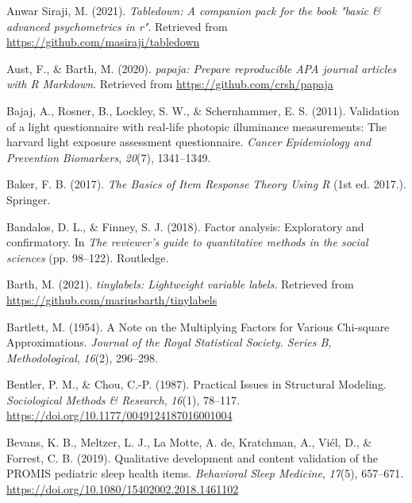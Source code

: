 \documentclass[
  english,
  man]{apa6}
\newlength{\cslhangindent}
\newlength{\cslentryspacingunit} %
\newenvironment{CSLReferences}[2] %
 {%
  \setlength{\parindent}{0pt}
  \ifodd #1
  \let\oldpar\par
  \def\par{\hangindent=\cslhangindent\oldpar}
  \fi
  \setlength{\parskip}{#2\cslentryspacingunit}
 }%
 {}
\begin{document}
\begingroup
\setlength{\parindent}{-0.5in}
\setlength{\leftskip}{0.5in}

\hypertarget{refs}{}
\begin{CSLReferences}{1}{0}
\leavevmode{}%
Anwar Siraji, M. (2021). \emph{Tabledown: A companion pack for the book "basic \& advanced psychometrics in r"}. Retrieved from \url{https://github.com/masiraji/tabledown}

\leavevmode{}%
Aust, F., \& Barth, M. (2020). \emph{{papaja}: {Prepare} reproducible {APA} journal articles with {R Markdown}}. Retrieved from \url{https://github.com/crsh/papaja}

\leavevmode{}%
Bajaj, A., Rosner, B., Lockley, S. W., \& Schernhammer, E. S. (2011). Validation of a light questionnaire with real-life photopic illuminance measurements: The harvard light exposure assessment questionnaire. \emph{Cancer Epidemiology and Prevention Biomarkers}, \emph{20}(7), 1341--1349.

\leavevmode{}%
Baker, F. B. (2017). \emph{The {Basics} of {Item Response Theory Using R}} (1st ed. 2017.). {Springer}.

\leavevmode{}%
Bandalos, D. L., \& Finney, S. J. (2018). Factor analysis: {Exploratory} and confirmatory. In \emph{The reviewer's guide to quantitative methods in the social sciences} (pp. 98--122). {Routledge}.

\leavevmode{}%
Barth, M. (2021). \emph{{tinylabels}: Lightweight variable labels}. Retrieved from \url{https://github.com/mariusbarth/tinylabels}

\leavevmode{}%
Bartlett, M. (1954). A {Note} on the {Multiplying Factors} for {Various Chi}-square {Approximations}. \emph{Journal of the Royal Statistical Society. Series B, Methodological}, \emph{16}(2), 296--298.

\leavevmode{}%
Bentler, P. M., \& Chou, C.-P. (1987). Practical {Issues} in {Structural Modeling}. \emph{Sociological Methods \& Research}, \emph{16}(1), 78--117. \url{https://doi.org/10.1177/0049124187016001004}

\leavevmode{}%
Bevans, K. B., Meltzer, L. J., La Motte, A. de, Kratchman, A., Viél, D., \& Forrest, C. B. (2019). Qualitative development and content validation of the PROMIS pediatric sleep health items. \emph{Behavioral Sleep Medicine}, \emph{17}(5), 657--671. \url{https://doi.org/10.1080/15402002.2018.1461102}


\end{CSLReferences}
\end{document}
